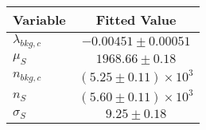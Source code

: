 \begin{tabular}[t]{lc}
\hline
Variable &Fitted Value\\
\hline\hline
$\lambda_{bkg,c}$&$-0.00451\pm0.00051$\\
\hline
$\mu_{S}$&$1968.66\pm0.18$\\
\hline
$n_{bkg,c}$&$(5.25\pm0.11)\times 10^3$\\
\hline
$n_{S}$&$(5.60\pm0.11)\times 10^3$\\
\hline
$\sigma_{S}$&$9.25\pm0.18$\\
\hline
\end{tabular}